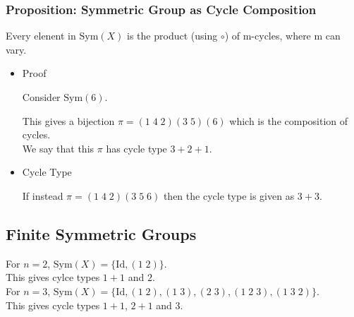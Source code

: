 \documentclass[11pt]{article}
\newcommand{\0}{\emptyset}
\begin{document}
\subsubsection*{Proposition: Symmetric Group as Cycle Composition}
\label{sec:orgd446b98}
Every elenent in \(\text{Sym}(X)\) is the product (using \(\circ\)) of m-cycles, where m can vary.\\[0pt]
\begin{itemize}
\item Proof
\label{sec:orgb1cc667}

Consider \(\text{Sym}(6)\).\\[0pt]
This gives a bijection \(\pi = (1\;4\;2)(3\;5)(6)\) which is the composition of cycles.\\[0pt]
We say that this \(\pi\) has cycle type \(3+2+1\).\\[0pt]
\item Cycle Type
\label{sec:org412f208}

If instead \(\pi=(1\;4\;2)(3\;5\;6)\) then the cycle type is given as \(3+3\).\\[0pt]
\end{itemize}
\subsection*{Finite Symmetric Groups}
\label{sec:orga8ff38c}
For \(n=2\), \(\text{Sym}(X)=\{\text{Id},(1\;2)\}\).\\[0pt]
This gives cylce types \(1+1\) and \(2\).\\[0pt]
For \(n=3\), \(\text{Sym}(X)=\{\text{Id},(1\;2),(1\;3),(2\;3),(1\;2\;3),(1\;3\;2)\}\).\\[0pt]
This gives cycle types \(1+1\), \(2+1\) and \(3\).\\[0pt]
\end{document}
